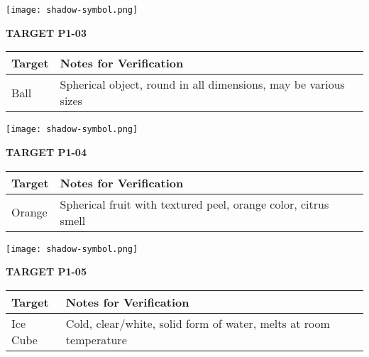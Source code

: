 \documentclass[10pt,twoside,final]{book} %
\makeatletter
\newcommand{\cleardoublepageWithSymbol}{%
  \clearpage %
  \if@twoside %
    \ifodd\c@page %
    \else %
      \thispagestyle{fancy} %
      \begingroup %
        \vspace*{0pt} %
        \vfill %
        \centering %
        \noindent 
        \texttt{[image: shadow-symbol.png]}
        \vfill %
      \endgroup
      \newpage    %
      \if@twocolumn\if@firstcolumn\else\hbox{}\newpage\fi\fi
    \fi
  \fi
}
\makeatother
\begin{document}
\cleardoublepageWithSymbol
\label{target:P1-03}
\begin{center}
\Large\textbf{TARGET P1-03}
\end{center}
\begin{mdframed}[backgroundcolor=white, linewidth=0.7pt, linecolor=rvprimary, shadow=true, shadowsize=1pt, shadowcolor=graydark!40, roundcorner=3pt]
\begin{tabular}{|p{3.5cm}|p{9cm}|}
\hline
\rowcolor{rvprimary!15}
\textbf{Target} & \textbf{Notes for Verification} \\
\hline
Ball & Spherical object, round in all dimensions, may be various sizes \\
\hline
\end{tabular}
\end{mdframed}


\cleardoublepageWithSymbol
\label{target:P1-04}
\begin{center}
\Large\textbf{TARGET P1-04}
\end{center}
\begin{mdframed}[backgroundcolor=white, linewidth=0.7pt, linecolor=rvprimary, shadow=true, shadowsize=1pt, shadowcolor=graydark!40, roundcorner=3pt]
\begin{tabular}{|p{3.5cm}|p{9cm}|}
\hline
\rowcolor{rvprimary!15}
\textbf{Target} & \textbf{Notes for Verification} \\
\hline
Orange & Spherical fruit with textured peel, orange color, citrus smell \\
\hline
\end{tabular}
\end{mdframed}


\cleardoublepageWithSymbol
\label{target:P1-05}
\begin{center}
\Large\textbf{TARGET P1-05}
\end{center}
\begin{mdframed}[backgroundcolor=white, linewidth=0.7pt, linecolor=rvprimary, shadow=true, shadowsize=1pt, shadowcolor=graydark!40, roundcorner=3pt]
\begin{tabular}{|p{3.5cm}|p{9cm}|}
\hline
\rowcolor{rvprimary!15}
\textbf{Target} & \textbf{Notes for Verification} \\
\hline
Ice Cube & Cold, clear/white, solid form of water, melts at room temperature \\
\hline
\end{tabular}
\end{mdframed}
\end{document}
